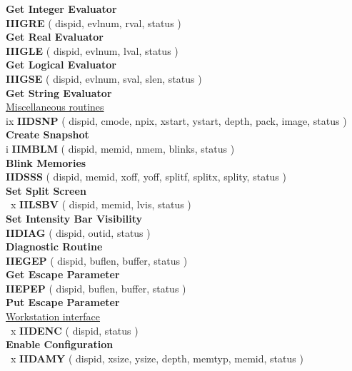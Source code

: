 \begin{tabbing}
                \> \> {\bf Get Integer Evaluator}\\ [1.5ex]
   \> {\bf IIIGRE} \> ( dispid, evlnum, rval, status )\\
                \> \> {\bf Get Real Evaluator}\\ [1.5ex]
   \> {\bf IIIGLE} \> ( dispid, evlnum, lval, status )\\
                \> \> {\bf Get Logical Evaluator}\\ [1.5ex]
   \> {\bf IIIGSE} \> ( dispid, evlnum, sval, slen, status )\\
                \> \> {\bf Get String Evaluator}\\ [1.5ex]
\> \underline{Miscellaneous routines}\\ [1.5ex]
ix \> {\bf IIDSNP} \> ( dispid, cmode, npix, xstart, ystart, depth, pack, image,
                        status )\\
                \> \> {\bf Create Snapshot}\\ [1.5ex]
i  \> {\bf IIMBLM} \> ( dispid, memid, nmem, blinks, status )\\
                \> \> {\bf Blink Memories}\\ [1.5ex]
   \> {\bf IIDSSS} \> ( dispid, memid, xoff, yoff, splitf, splitx, splity,
                        status )\\
                \> \> {\bf Set Split Screen}\\ [1.5ex]
~x \> {\bf IILSBV} \> ( dispid, memid, lvis, status )\\
                \> \> {\bf Set Intensity Bar Visibility}\\ [1.5ex]
   \> {\bf IIDIAG} \> ( dispid, outid, status )\\
                \> \> {\bf Diagnostic Routine}\\ [1.5ex]
   \> {\bf IIEGEP} \> ( dispid, buflen, buffer, status )\\
                \> \> {\bf Get Escape Parameter}\\ [1.5ex]
   \> {\bf IIEPEP} \> ( dispid, buflen, buffer, status )\\
                \> \> {\bf Put Escape Parameter}\\ [1.5ex]
\> \underline{Workstation interface}\\ [1.5ex]
~x \> {\bf IIDENC} \> ( dispid, status )\\
                \> \> {\bf Enable Configuration}\\ [1.5ex]
~x \> {\bf IIDAMY} \> ( dispid, xsize, ysize, depth, memtyp, memid, status )\\

\end{tabbing}
